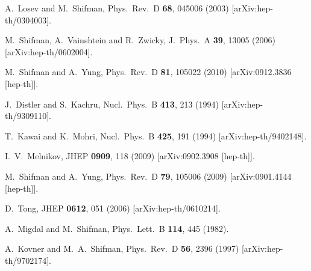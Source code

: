 \documentclass[epsfig,12pt]{article}
\begin{document}
{\begin{thebibliography}{99}
A.~Losev and M.~Shifman,
  Phys.\ Rev.\  D {\bf 68}, 045006 (2003)
  [arXiv:hep-th/0304003].
  
  M.~Shifman, A.~Vainshtein and R.~Zwicky,
  J.\ Phys.\ A  {\bf 39}, 13005 (2006)
  [arXiv:hep-th/0602004].
  
  M.~Shifman and A.~Yung,
  Phys.\ Rev.\  D {\bf 81}, 105022 (2010)
  [arXiv:0912.3836 [hep-th]].
  
  J.~Distler and S.~Kachru,
  Nucl.\ Phys.\  B {\bf 413}, 213 (1994)
  [arXiv:hep-th/9309110].
  
  T.~Kawai and K.~Mohri,
  Nucl.\ Phys.\  B {\bf 425}, 191 (1994)
  [arXiv:hep-th/9402148].
  
  I.~V.~Melnikov,
  JHEP {\bf 0909}, 118 (2009)
  [arXiv:0902.3908 [hep-th]].
  
  M.~Shifman and A.~Yung,
  Phys.\ Rev.\  D {\bf 79}, 105006 (2009)
  [arXiv:0901.4144 [hep-th]].

 D.~Tong,
  JHEP {\bf 0612}, 051 (2006)
  [arXiv:hep-th/0610214].

  
  A.~Migdal and M.~Shifman,
  Phys.\ Lett.\  B {\bf 114}, 445 (1982).
  
  A.~Kovner and M.~A.~Shifman,
  Phys.\ Rev.\  D {\bf 56}, 2396 (1997)
  [arXiv:hep-th/9702174].


\end{thebibliography}}
\end{document}
